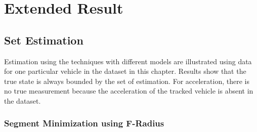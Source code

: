 
\chapter{Extended Result}
\FloatBarrier
\section{Set Estimation}\label{eresult:setest}
\FloatBarrier
Estimation using the techniques with different models are illustrated using data for one particular vehicle in the dataset in this chapter. Results show that the true state is always bounded by the set of estimation. For acceleration, there is no true measurement because the acceleration of the tracked vehicle is absent in the dataset.

\subsection{Segment Minimization using F-Radius}
\FloatBarrier
